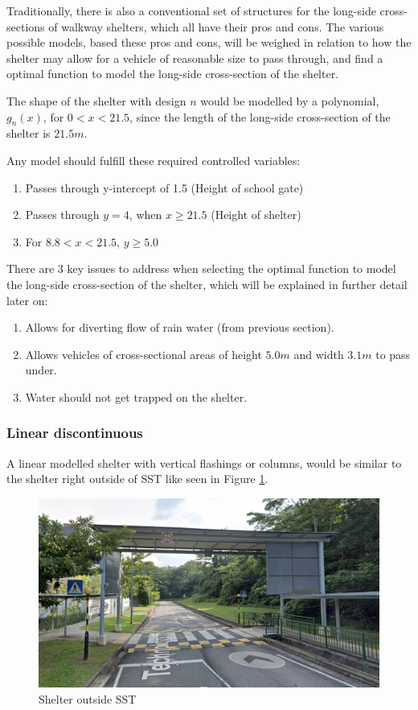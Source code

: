 \documentclass[a4paper,titlepage]{article}
\begin{document}
Traditionally, there is also a conventional set of structures for the long-side cross-sections of walkway shelters, which all have their pros and cons. The various possible models, based these pros and cons, will be weighed in relation to how the shelter may allow for a vehicle of reasonable size to pass through, and find a optimal function to model the long-side cross-section of the shelter.

The shape of the shelter with design $n$ would be modelled by a polynomial, $g_n(x)$, for $0<x<21.5$, since the length of the long-side cross-section of the shelter is $21.5\si{m}$.

Any model should fulfill these required controlled variables:
\begin{enumerate}
    \item Passes through y-intercept of 1.5 (Height of school gate)
    \item Passes through $y=4$, when $x\ge21.5$ (Height of shelter)
    \item For $8.8<x<21.5$, $y\ge5.0$
\end{enumerate}

There are 3 key issues to address when selecting the optimal function to model the long-side cross-section of the shelter, which will be explained in further detail later on:

\begin{enumerate}
    \item Allows for diverting flow of rain water (from previous section).
    \item Allows vehicles of cross-sectional areas of height $5.0\si{m}$ and width $3.1\si{m}$ to pass under.
    \item Water should not get trapped on the shelter.
\end{enumerate}

\subsubsection{Linear discontinuous}
A linear modelled shelter with vertical flashings or columns, would be similar to the shelter right outside of SST like seen in Figure \ref{fig:shelterOutsideSst}.

\begin{figure}[htbp]
    \centering
    \includegraphics[width=\textwidth]{shelterOutsideSst.png}
    \caption{Shelter outside SST}
    \label{fig:shelterOutsideSst}
\end{figure}
\end{document}
